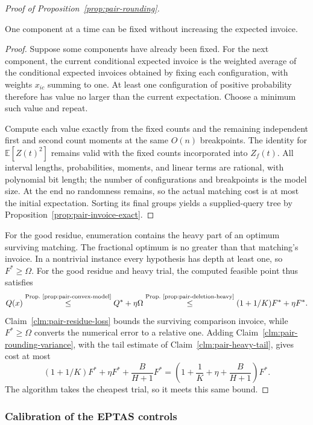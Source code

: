 \begin{proof}[Proof of Proposition~\ref{prop:pair-rounding}]
\begin{claim}
One component at a time can be fixed without increasing the expected invoice.
\end{claim}
\begin{proof}
Suppose some components have already been fixed. For the next
component, the current conditional expected invoice is the weighted
average of the conditional expected invoices obtained by fixing each
configuration, with weights $x_{ic}$ summing to one. At least one
configuration of positive probability therefore has value no larger
than the current expectation. Choose a minimum such value and repeat.

Compute each value exactly from the fixed counts and the remaining
independent first and second count moments at the same $O(n)$
breakpoints. The identity for $\mathbb E[Z(t)^2]$ remains valid with
the fixed counts incorporated into $Z_f(t)$. All interval lengths,
probabilities, moments, and linear terms are rational, with polynomial
bit length; the number of configurations and breakpoints is the model
size. At the end no randomness remains, so the actual matching cost is
at most the initial expectation. Sorting its final groups yields
a supplied-query tree by Proposition~\ref{prop:pair-invoice-exact}.

\end{proof}
For the good residue, enumeration contains the heavy part of an optimum
surviving matching. The fractional optimum is no greater than that
matching's invoice. In a nontrivial instance every hypothesis has depth at least one,
so $F^*\ge\Omega$. For the good residue and heavy trial, the computed
feasible point thus satisfies
\[
 Q(x)\byref{Prop.}{prop:pair-convex-model}{\le} Q^*+\eta\Omega
       \byref{Prop.}{prop:pair-deletion-heavy}{\le}(1+1/K)F^*+\eta F^*.
\]
Claim~\ref{clm:pair-residue-loss} bounds the surviving comparison
invoice, while $F^*\ge\Omega$ converts the numerical error to a
relative one. Adding Claim~\ref{clm:pair-rounding-variance}, with the
tail estimate of Claim~\ref{clm:pair-heavy-tail}, gives cost at most
\[
 (1+1/K)F^*+\eta F^*+\frac B{H+1}F^*
 =\left(1+\frac1K+\eta+\frac B{H+1}\right)F^*.
\]
The algorithm takes the cheapest trial, so it meets this same bound.
\end{proof}

\subsubsection{Calibration of the EPTAS controls}
\label{sec:pair-eptas-calibration}

